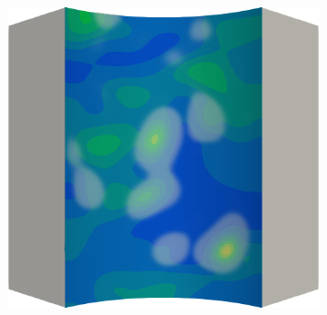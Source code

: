 \begin{frame}
\begin{columns}[T]
\begin{column}{0.6\textwidth}
\begin{figure}
{\begin{subfigure}{0.19\textwidth}
          \end{subfigure}
          \hspace{0.06\textwidth}
          \begin{subfigure}{0.19\textwidth}
            \centering
            \includegraphics[width=\textwidth]{Chapter345/figures/ep.0009}
          \end{subfigure}
        }
        

\end{figure}
\end{column}
\end{columns}
\end{frame}

